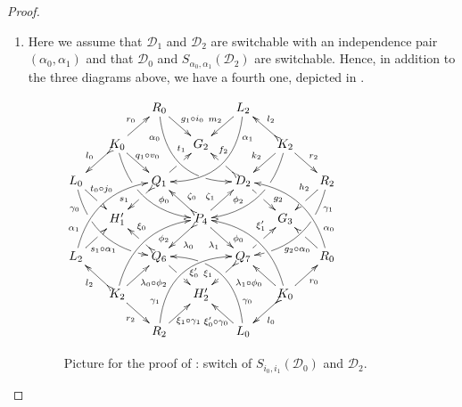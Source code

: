 \documentclass[a4paper,UKenglish,cleveref,pdftex,thm-restate,numberwithinsect]{lipics-v2021}
\newcommand{\dder}[1]{\mathscr{#1}}
\begin{document}
\begin{proof}
\begin{enumerate}
              \item Here we assume that
                $\dder{D}_1$ and $\dder{D}_2$ are switchable  with an
    independence pair $(\alpha_0, \alpha_1)$ and that
    $\dder{D}_0$ and $S_{\alpha_0, \alpha_1}(\dder{D}_2)$ are switchable.
                Hence, in addition to the three diagrams above, we have a fourth one, depicted in .
		\begin{figure}[h]
			\centering
			$\xymatrix@C=15pt@R=15pt{&&R_0 \ar@/_.8cm/[ddrr]_(.2){\alpha_0}|(.7)\hole \ar[dr]^{\hspace{-1pt}g_1\circ i_0}&& L_2\ar@/^.8cm/[ddll]^(.2){\alpha_1}  \ar[dl]_{m_2\hspace{-2pt}}\\
				&K_0\ar[dr]^{\hspace{-4pt}q_1\circ v_0}\ar@{>->}[dl]_{l_0} \ar@/_.6cm/[ddrr]|(.36)\hole^(.65){\phi_0}\ar[ur]^{r_0}&& G_2 && K_2 \ar@/^.6cm/[ddll]|(.36)\hole_(.65){\phi_2}\ar[dl]_{k_2}\ar@{>->}[lu]_{l_2} \ar[dr]^{r_2}\\
				L_0 \ar@/_.6cm/[ddrr]_(.2){\gamma_0}|(.31)\hole|(.81)\hole \ar[dr]^(.4){\hspace{-4pt}t_0\circ j_0}|(.6)\hole && Q_1 \ar@{>->}[dl]|(.4)\hole_(.65){s_1}\ar[ur]|(.5)\hole^(.7){t_1}&&D_2 \ar[dr]|(.4)\hole^(.65){g_2} \ar@{>->}[ul]|(.5)\hole_(.65){f_2}&&R_2\ar@/^.6cm/[ddll]^(.2){\gamma_1}|(.31)\hole|(.81)\hole\ar[dl]_(.35){h_2}|(.6)\hole\\&H'_1 &&P_4\ar[dr]_{\lambda_1} \ar@{>->}[dl]^{\lambda_0}\ar[ur]^(.4){\zeta_1}\ar@{>->}[ul]_(.4){\zeta_0}&&G_3\\
				L_2 \ar@/^.6cm/[uurr]^(.2){\alpha_1} \ar[ur]_(.35){\hspace{-2pt}s_1\circ
					\alpha_1}|(.61)\hole&&Q_6
				\ar@{>->}[ul]|(.4)\hole_(.6){\xi_0}\ar[dr]|(.5)\hole^(.65){\xi'_0}
				&&Q_7\ar[ur]|(.4)\hole^(.6){\xi'_1}
				\ar@{>->}[dl]|(.5)\hole_(.65){\xi_1} && R_0 \ar[ul]^(.35){g_2\circ
					\alpha_0}|(.61)\hole\ar@/_.6cm/[uull]_(.2){\alpha_0}\\&K_2
				\ar[ur]_{\lambda_0\circ \phi_2} \ar[dr]_{r_2}
				\ar@{>->}[ul]^{l_2}\ar@/^.6cm/[uurr]_(.65){\phi_2}&&H'_2&& K_0
				\ar[ur]_{r_0} \ar[ul]^{\lambda_1\circ \phi_0} \ar@{>->}[dl]^{l_0}
				\ar@/_.6cm/[uull]^(.65){\phi_0}\\&& R_2
				\ar[ur]_{\hspace{-5pt}\xi_1\circ
					\gamma_1}\ar@/^.8cm/[uurr]^(.2){\gamma_1}&& L_0
				\ar[ul]^{\xi'_0\circ \gamma_0\hspace{-7pt}}
				\ar@/_.8cm/[uull]_(.2){\gamma_0} |(.69)\hole 
			}	$
			\caption{Picture for the proof of : switch of $S_{i_0, i_1}(\dder{D}_0)$ and $\dder{D}_2$.}
			\label{fi:fourth}
		\end{figure}
		

\end{enumerate}
\end{proof}
\end{document}
